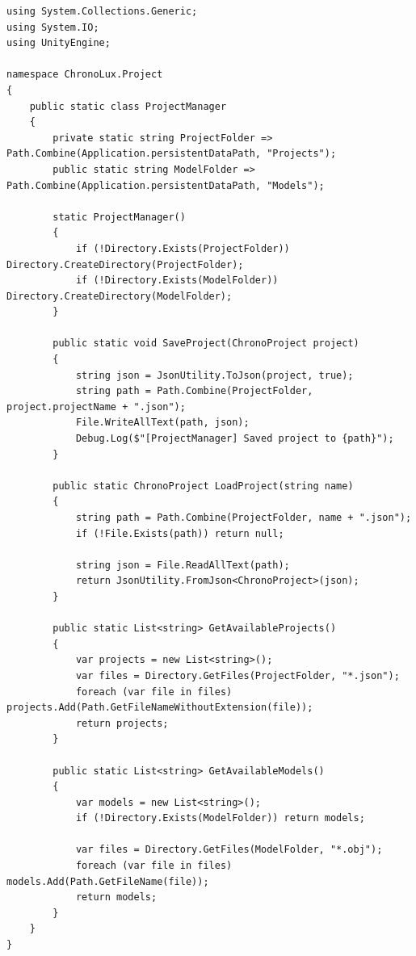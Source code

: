\begin{lstlisting}[language={[Sharp]C}, caption={ProjectManager.cs: Manages the serialization and deserialization of the simulation project.}, label={lst:projectmanager}]
using System.Collections.Generic;
using System.IO;
using UnityEngine;

namespace ChronoLux.Project
{
    public static class ProjectManager
    {
        private static string ProjectFolder => Path.Combine(Application.persistentDataPath, "Projects");
        public static string ModelFolder => Path.Combine(Application.persistentDataPath, "Models");

        static ProjectManager()
        {
            if (!Directory.Exists(ProjectFolder)) Directory.CreateDirectory(ProjectFolder);
            if (!Directory.Exists(ModelFolder)) Directory.CreateDirectory(ModelFolder);
        }

        public static void SaveProject(ChronoProject project)
        {
            string json = JsonUtility.ToJson(project, true);
            string path = Path.Combine(ProjectFolder, project.projectName + ".json");
            File.WriteAllText(path, json);
            Debug.Log($"[ProjectManager] Saved project to {path}");
        }

        public static ChronoProject LoadProject(string name)
        {
            string path = Path.Combine(ProjectFolder, name + ".json");
            if (!File.Exists(path)) return null;

            string json = File.ReadAllText(path);
            return JsonUtility.FromJson<ChronoProject>(json);
        }

        public static List<string> GetAvailableProjects()
        {
            var projects = new List<string>();
            var files = Directory.GetFiles(ProjectFolder, "*.json");
            foreach (var file in files) projects.Add(Path.GetFileNameWithoutExtension(file));
            return projects;
        }

        public static List<string> GetAvailableModels()
        {
            var models = new List<string>();
            if (!Directory.Exists(ModelFolder)) return models;

            var files = Directory.GetFiles(ModelFolder, "*.obj");
            foreach (var file in files) models.Add(Path.GetFileName(file));
            return models;
        }
    }
}
\end{lstlisting}

